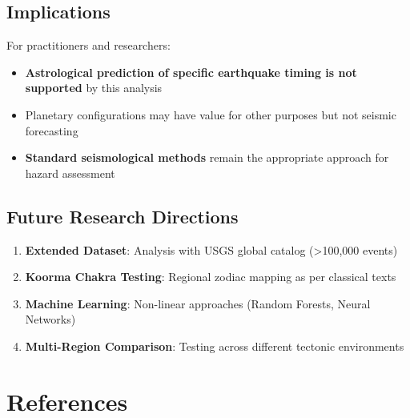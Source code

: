 \documentclass[
  11pt,
  a4paper,
  oneside,
  openany]{article}
\providecommand{\tightlist}{%
  \setlength{\itemsep}{0pt}\setlength{\parskip}{0pt}}\usepackage{longtable,booktabs,array}
\begin{document}
\subsection{Implications}\label{implications}

For practitioners and researchers:

\begin{itemize}
\tightlist
\item
  \textbf{Astrological prediction of specific earthquake timing is not
  supported} by this analysis
\item
  Planetary configurations may have value for other purposes but not
  seismic forecasting
\item
  \textbf{Standard seismological methods} remain the appropriate
  approach for hazard assessment
\end{itemize}

\subsection{Future Research
Directions}\label{future-research-directions}

\begin{enumerate}
\def\labelenumi{\arabic{enumi}.}
\tightlist
\item
  \textbf{Extended Dataset}: Analysis with USGS global catalog
  (\textgreater100,000 events)
\item
  \textbf{Koorma Chakra Testing}: Regional zodiac mapping as per
  classical texts
\item
  \textbf{Machine Learning}: Non-linear approaches (Random Forests,
  Neural Networks)
\item
  \textbf{Multi-Region Comparison}: Testing across different tectonic
  environments
\end{enumerate}

\section{References}\label{references}
\end{document}

